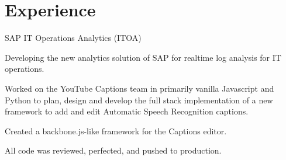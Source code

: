 \documentclass[letterpaper]{deedy-resume} %
\begin{document}
\begin{minipage}[t]{0.66\textwidth} %


\section{Experience}


\vspace{\topsep} %
\begin{tightitemize}
  \item SAP IT Operations Analytics (ITOA)
  \begin{tightitemize}
  \item Developing the new analytics solution of SAP for realtime log analysis for IT operations.
  \end{tightitemize}
\end{tightitemize}

\sectionspace %



\begin{tightitemize}
\item Worked on the YouTube Captions team in primarily vanilla Javascript and Python to plan, design and develop the full stack implementation of a new framework to add and edit Automatic Speech Recognition captions.
\item Created a backbone.js-like framework for the Captions editor.
\item All code was reviewed, perfected, and pushed to production.
\end{tightitemize}

\sectionspace %




\end{minipage}
\end{document}
